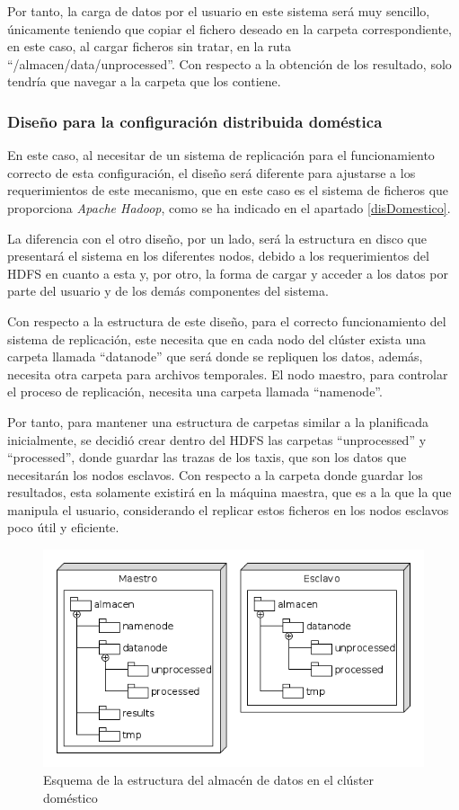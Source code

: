 Por tanto, la carga de datos por el usuario en este sistema será muy sencillo, únicamente teniendo que copiar el fichero deseado en la carpeta correspondiente, en este caso, al cargar ficheros sin tratar, en la ruta ``/almacen/data/unprocessed''. Con respecto a la obtención de los resultado, solo tendría que navegar a la carpeta que los contiene.

\subsubsection{Diseño para la configuración distribuida doméstica \label{disHDFS}}
En este caso, al necesitar de un sistema de replicación para el funcionamiento correcto de esta configuración, el diseño será diferente para ajustarse a los requerimientos de este mecanismo, que en este caso es el sistema de ficheros que proporciona \textit{Apache Hadoop},  como se ha indicado en el apartado \ref{disDomestico}.

La diferencia con el otro diseño, por un lado, será la estructura en disco que presentará el sistema en los diferentes nodos, debido a los requerimientos del \gls{HDFS} en cuanto a esta y, por otro, la forma de cargar y acceder a los datos por parte del usuario y de los demás componentes del sistema.

Con respecto a la estructura de este diseño, para el correcto funcionamiento del sistema de replicación, este necesita que en cada nodo del clúster exista una carpeta llamada ``datanode'' que será donde se repliquen los datos, además, necesita otra carpeta para archivos temporales. El nodo maestro, para controlar el proceso de replicación, necesita una carpeta llamada ``namenode''.

Por tanto, para mantener una estructura de carpetas similar a la planificada inicialmente, se decidió crear dentro del \gls{HDFS} las carpetas ``unprocessed'' y ``processed'', donde guardar las trazas de los taxis, que son los datos que necesitarán los nodos esclavos. Con respecto a la carpeta donde guardar los resultados, esta solamente existirá en la máquina maestra, que es a la que la que manipula el usuario, considerando el replicar estos ficheros en los nodos esclavos poco útil y eficiente.

\begin{figure}[htp!]
\centering
\caption{Esquema de la estructura del almacén de datos en el clúster doméstico}
\label{fig:esquemahdfs}
\includegraphics[scale=0.7]{diagramas/esquemahdfs}
\end{figure}

